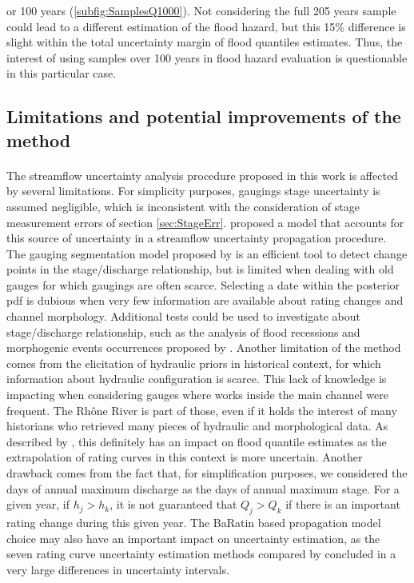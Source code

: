 \documentclass[11pt]{article}
\begin{document}
or 100 years (\ref{subfig:SamplesQ1000}). Not considering the full 205 years sample could lead to a different estimation of the flood hazard, but this 15\% difference is slight within the total uncertainty margin of flood quantiles estimates. Thus, the interest of using samples over 100 years in flood hazard evaluation is questionable in this particular case. 
    
    
    \subsection{Limitations and potential improvements of the method}
    \paragraph{}
    The streamflow uncertainty analysis procedure proposed in this work is affected by several limitations. For simplicity purposes, gaugings stage uncertainty is assumed negligible, which is inconsistent with the consideration of stage measurement errors of section \ref{sec:StageErr}. \citet{horner_impact_2018} proposed a model that accounts for this source of uncertainty in a streamflow uncertainty propagation procedure. The gauging segmentation model proposed by \citet{darienzo_detection_2021} is an efficient tool to detect change points in the stage/discharge relationship, but is limited when dealing with old gauges for which gaugings are often scarce. Selecting a date within the posterior pdf is dubious when very few information are available about rating changes and channel morphology. Additional tests could be used to investigate about stage/discharge relationship, such as the analysis of flood recessions and morphogenic events occurrences proposed by \citet{darienzo_detection_2021-1}. Another limitation of the method comes from the elicitation of hydraulic priors in historical context, for which information about hydraulic configuration is scarce. This lack of knowledge is impacting when considering gauges where works inside the main channel were frequent. The Rhône River is part of those, even if it holds the interest of many historians who retrieved many pieces of hydraulic and morphological data. As described by \citet{petersen-overleir_accounting_2009}, this definitely has an impact on flood quantile estimates as the extrapolation of rating curves in this context is more uncertain. Another drawback comes from the fact that, for simplification purposes, we considered the days of annual maximum discharge as the days of annual maximum stage. For a given year, if $h_{j} > h_{k}$, it is not guaranteed that $Q_{j} > Q_{k}$ if there is an important rating change during this given year. The BaRatin \citep{lecoz_quantification_2014} based propagation model choice may also have an important impact on uncertainty estimation, as the seven rating curve uncertainty estimation methods compared by \citet{kiang_comparison_2018} concluded in a very large differences in uncertainty intervals. 
\end{document}
